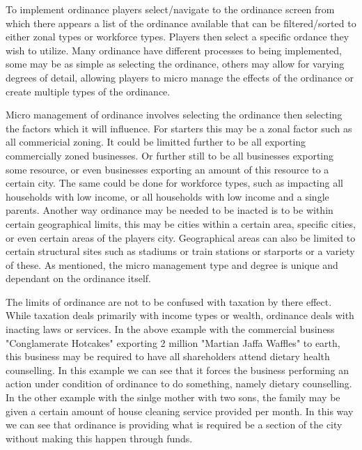 To implement ordinance players select/navigate to the ordinance screen from which there appears a list of the ordinance available that can be filtered/sorted to either zonal types or workforce types. Players then select a specific ordance they wish to utilize. Many ordinance have different processes to being implemented, some may be as simple as selecting the ordinance, others may allow for varying degrees of detail, allowing players to micro manage the effects of the ordinance or create multiple types of the ordinance. 

Micro management of ordinance involves selecting the ordinance then selecting the factors which it will influence. For starters this may be a zonal factor such as all commericial zoning. It could be limitted further to be all exporting commercially zoned businesses. Or further still to be all businesses exporting some resource, or even businesses exporting an amount of this resource to a certain city. The same could be done for workforce types, such as impacting all households with low income, or all households with low income and a single parents. Another way ordinance may be needed to be inacted is to be within certain geographical limits, this may be cities within a certain area, specific cities, or even certain areas of the players city. Geographical areas can also be limited to certain structural sites such as stadiums or train stations or starports or a variety of these. As mentioned, the micro management type and degree is unique and dependant on the ordinance itself.

The limits of ordinance are not to be confused with taxation by there effect. While taxation deals primarily with income types or wealth, ordinance deals with inacting laws or services. In the above example with the commercial business "Conglamerate Hotcakes" exporting 2 million "Martian Jaffa Waffles" to earth, this business may be required to have all shareholders attend dietary health counselling. In this example we can see that it forces the business performing an action under condition of ordinance to do something, namely dietary counselling. In the other example with the sinlge mother with two sons, the family may be given a certain amount of house cleaning service provided per month. In this way we can see that ordinance is providing what is required be a section of the city without making this happen through funds.  



